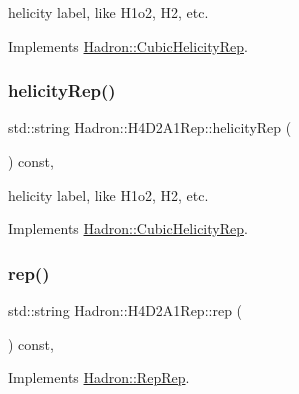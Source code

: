 helicity label, like H1o2, H2, etc. 

Implements \mbox{\hyperlink{structHadron_1_1CubicHelicityRep_af1096946b7470edf0a55451cc662f231}{Hadron\+::\+Cubic\+Helicity\+Rep}}.

\mbox{\label{structHadron_1_1H4D2A1Rep_a64d7b12a9ed77971c31f5ce36e3b22bc}} 
\subsubsection{\texorpdfstring{helicityRep()}{helicityRep()}\hspace{0.1cm}{\footnotesize\ttfamily [3/3]}}
{\footnotesize\ttfamily std\+::string Hadron\+::\+H4\+D2\+A1\+Rep\+::helicity\+Rep (\begin{DoxyParamCaption}{ }\end{DoxyParamCaption}) const\hspace{0.3cm}{\ttfamily [inline]}, {\ttfamily [virtual]}}

helicity label, like H1o2, H2, etc. 

Implements \mbox{\hyperlink{structHadron_1_1CubicHelicityRep_af1096946b7470edf0a55451cc662f231}{Hadron\+::\+Cubic\+Helicity\+Rep}}.

\mbox{\label{structHadron_1_1H4D2A1Rep_ad4b2ccfecdb8297fd88eaa27c9d1262e}} 
\subsubsection{\texorpdfstring{rep()}{rep()}\hspace{0.1cm}{\footnotesize\ttfamily [1/5]}}
{\footnotesize\ttfamily std\+::string Hadron\+::\+H4\+D2\+A1\+Rep\+::rep (\begin{DoxyParamCaption}{ }\end{DoxyParamCaption}) const\hspace{0.3cm}{\ttfamily [inline]}, {\ttfamily [virtual]}}



Implements \mbox{\hyperlink{structHadron_1_1RepRep_ab3213025f6de249f7095892109575fde}{Hadron\+::\+Rep\+Rep}}.

\mbox{\label{structHadron_1_1H4D2A1Rep_ad4b2ccfecdb8297fd88eaa27c9d1262e}} 
